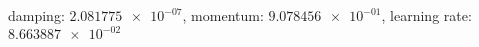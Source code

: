 damping: $\num[scientific-notation=true]{2.081775e-07}$, momentum: $\num[scientific-notation=true]{9.078456e-01}$, learning rate: $\num[scientific-notation=true]{8.663887e-02}$